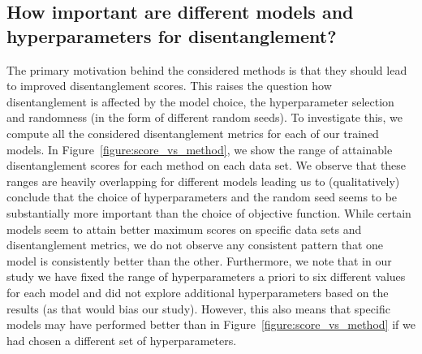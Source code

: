 \subsection{How important are different models and hyperparameters for disentanglement?}\label{app:hyper_importance}
The primary motivation behind the considered methods is that they should lead to improved disentanglement scores.
This raises the question how disentanglement is affected by the model choice, the hyperparameter selection and randomness (in the form of different random seeds).
To investigate this, we compute all the considered disentanglement metrics for each of our trained models.
In Figure~\ref{figure:score_vs_method}, we show the range of attainable disentanglement scores for each method on each data set.
We observe that these ranges are heavily overlapping for different models leading us to (qualitatively) conclude that the choice of hyperparameters and the random seed seems to be substantially more important than the choice of objective function. 
While certain models seem to attain better maximum scores on specific data sets and disentanglement metrics, we do not observe any consistent pattern that one model is consistently better than the other.
Furthermore, we note that in our study we have fixed the range of hyperparameters a priori to six different values for each model and did not explore additional hyperparameters based on the results (as that would bias our study).
However, this also means that specific models may have performed better than in Figure~\ref{figure:score_vs_method} if we had chosen a different set of hyperparameters.
